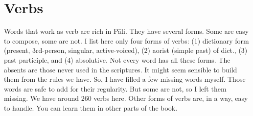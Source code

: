 \section{Verbs}\label{vocab:verb}

Words that work as verb are rich in P\=ali. They have several forms. Some are easy to compose, some are not. I list here only four forms of verbs:
(1) dictionary form (present, 3rd-person, singular, active-voiced), (2) aorist (simple past) of dict., (3) past participle, and (4) absolutive. Not every word has all these forms. The absents are those never used in the scriptures. It might seem sensible to build them from the rules we have. So, I have filled a few missing words myself. Those words are safe to add for their regularity. But some are not, so I left them missing. We have around 260 verbs here. Other forms of verbs are, in a way, easy to handle. You can learn them in other parts of the book.

